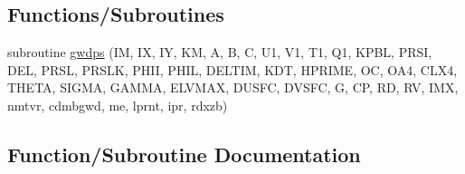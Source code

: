 \subsection*{Functions/\+Subroutines}
\begin{DoxyCompactItemize}
\item 
subroutine \hyperlink{group___g_f_s__ogwd_ga82eda62e1bdee0a0ab6a831fc53ae89c}{gwdps} (IM, IX, IY, KM, A, B, C, U1, V1, T1, Q1, K\+P\+BL, P\+R\+SI, D\+EL, P\+R\+SL, P\+R\+S\+LK, P\+H\+II, P\+H\+IL, D\+E\+L\+T\+IM, K\+DT, H\+P\+R\+I\+ME, OC, O\+A4, C\+L\+X4, T\+H\+E\+TA, S\+I\+G\+MA, G\+A\+M\+MA, E\+L\+V\+M\+AX, D\+U\+S\+FC, D\+V\+S\+FC, G, CP, RD, RV, I\+MX, nmtvr, cdmbgwd, me, lprnt, ipr, rdxzb)
\end{DoxyCompactItemize}


\subsection{Function/\+Subroutine Documentation}
\mbox{\label{group___g_f_s__ogwd_ga82eda62e1bdee0a0ab6a831fc53ae89c}} 
